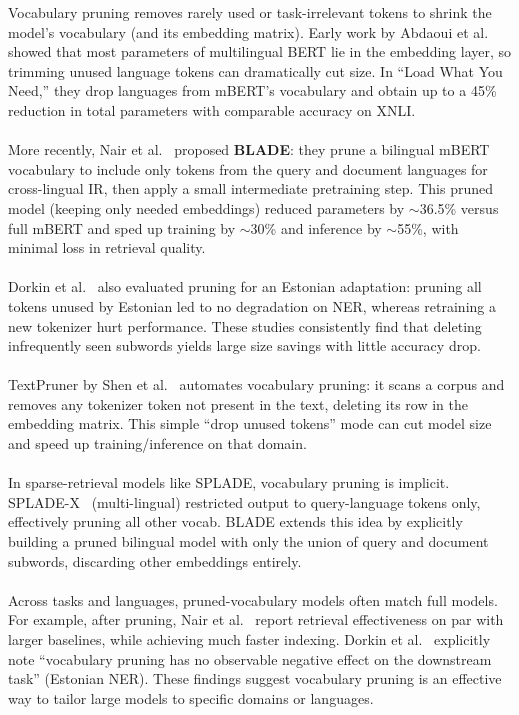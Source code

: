 \documentclass[twocolumn]{article}
\begin{document}
Vocabulary pruning removes rarely used or task-irrelevant tokens to shrink the model's vocabulary (and its embedding matrix). Early work by Abdaoui et al.~\cite{abdaoui2020load} showed that most parameters of multilingual BERT lie in the embedding layer, so trimming unused language tokens can dramatically cut size. In ``Load What You Need,'' they drop languages from mBERT's vocabulary and obtain up to a 45\% reduction in total parameters with comparable accuracy on XNLI.
\\ \\
More recently, Nair et al.~\cite{nair2023blade} proposed \textbf{BLADE}: they prune a bilingual mBERT vocabulary to include only tokens from the query and document languages for cross-lingual IR, then apply a small intermediate pretraining step. This pruned model (keeping only needed embeddings) reduced parameters by $\sim$36.5\% versus full mBERT and sped up training by $\sim$30\% and inference by $\sim$55\%, with minimal loss in retrieval quality.
\\ \\
Dorkin et al.~\cite{dorkin2025estonian} also evaluated pruning for an Estonian adaptation: pruning all tokens unused by Estonian led to no degradation on NER, whereas retraining a new tokenizer hurt performance. These studies consistently find that deleting infrequently seen subwords yields large size savings with little accuracy drop.
\\ \\
TextPruner by Shen et al.~\cite{shen2022textpruner} automates vocabulary pruning: it scans a corpus and removes any tokenizer token not present in the text, deleting its row in the embedding matrix. This simple ``drop unused tokens'' mode can cut model size and speed up training/inference on that domain.
\\ \\
In sparse-retrieval models like SPLADE, vocabulary pruning is implicit. SPLADE-X~\cite{formal2023spladex} (multi-lingual) restricted output to query-language tokens only, effectively pruning all other vocab. BLADE extends this idea by explicitly building a pruned bilingual model with only the union of query and document subwords, discarding other embeddings entirely.
\\ \\
Across tasks and languages, pruned-vocabulary models often match full models. For example, after pruning, Nair et al.~\cite{nair2023blade} report retrieval effectiveness on par with larger baselines, while achieving much faster indexing. Dorkin et al.~\cite{dorkin2025estonian} explicitly note ``vocabulary pruning has no observable negative effect on the downstream task'' (Estonian NER). These findings suggest vocabulary pruning is an effective way to tailor large models to specific domains or languages.
\end{document}
